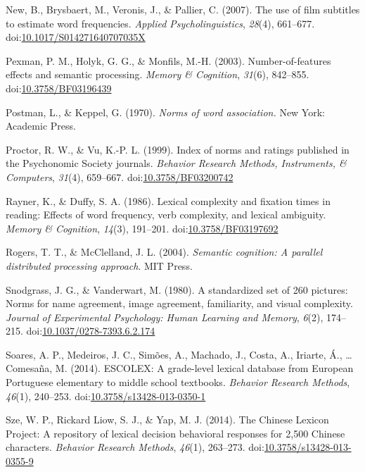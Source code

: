 \documentclass[english,man]{apa6}
\theoremstyle{definition}
\theoremstyle{definition}
\theoremstyle{definition}
\theoremstyle{remark}
\begin{document}
\hypertarget{ref-New2007}{}
New, B., Brysbaert, M., Veronis, J., \& Pallier, C. (2007). The use of
film subtitles to estimate word frequencies. \emph{Applied
Psycholinguistics}, \emph{28}(4), 661--677.
doi:\href{https://doi.org/10.1017/S014271640707035X}{10.1017/S014271640707035X}

\hypertarget{ref-Pexman2003}{}
Pexman, P. M., Holyk, G. G., \& Monfils, M.-H. (2003).
Number-of-features effects and semantic processing. \emph{Memory \&
Cognition}, \emph{31}(6), 842--855.
doi:\href{https://doi.org/10.3758/BF03196439}{10.3758/BF03196439}

\hypertarget{ref-Postman1970}{}
Postman, L., \& Keppel, G. (1970). \emph{Norms of word association.} New
York: Academic Press.

\hypertarget{ref-Proctor1999}{}
Proctor, R. W., \& Vu, K.-P. L. (1999). Index of norms and ratings
published in the Psychonomic Society journals. \emph{Behavior Research
Methods, Instruments, \& Computers}, \emph{31}(4), 659--667.
doi:\href{https://doi.org/10.3758/BF03200742}{10.3758/BF03200742}

\hypertarget{ref-Rayner1986}{}
Rayner, K., \& Duffy, S. A. (1986). Lexical complexity and fixation
times in reading: Effects of word frequency, verb complexity, and
lexical ambiguity. \emph{Memory \& Cognition}, \emph{14}(3), 191--201.
doi:\href{https://doi.org/10.3758/BF03197692}{10.3758/BF03197692}

\hypertarget{ref-Rogers2004}{}
Rogers, T. T., \& McClelland, J. L. (2004). \emph{Semantic cognition: A
parallel distributed processing approach}. MIT Press.

\hypertarget{ref-Snodgrass1980}{}
Snodgrass, J. G., \& Vanderwart, M. (1980). A standardized set of 260
pictures: Norms for name agreement, image agreement, familiarity, and
visual complexity. \emph{Journal of Experimental Psychology: Human
Learning and Memory}, \emph{6}(2), 174--215.
doi:\href{https://doi.org/10.1037/0278-7393.6.2.174}{10.1037/0278-7393.6.2.174}

\hypertarget{ref-Soares2014}{}
Soares, A. P., Medeiros, J. C., Simões, A., Machado, J., Costa, A.,
Iriarte, Á., \ldots{} Comesaña, M. (2014). ESCOLEX: A grade-level
lexical database from European Portuguese elementary to middle school
textbooks. \emph{Behavior Research Methods}, \emph{46}(1), 240--253.
doi:\href{https://doi.org/10.3758/s13428-013-0350-1}{10.3758/s13428-013-0350-1}

\hypertarget{ref-Sze2014}{}
Sze, W. P., Rickard Liow, S. J., \& Yap, M. J. (2014). The Chinese
Lexicon Project: A repository of lexical decision behavioral responses
for 2,500 Chinese characters. \emph{Behavior Research Methods},
\emph{46}(1), 263--273.
doi:\href{https://doi.org/10.3758/s13428-013-0355-9}{10.3758/s13428-013-0355-9}
\end{document}
